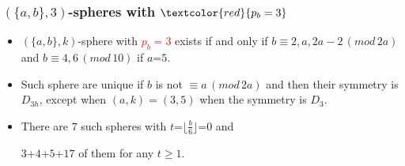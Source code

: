 \documentclass{beamer}
\begin{document}


\begin{frame}\frametitle{$(\{a,b\},3)$-spheres with
$\textcolor{red}{p_b=3}$}
\begin{itemize}

\item   $(\{a,b\},k)$-sphere with \textcolor{red}{$p_b=3$} exists
if and only if
$b\equiv 2,a,2a-2\,(mod\,2a)$ and  $b\equiv 4,6\,(mod\,10)$
if $a$=$5$.
\item  Such sphere are unique if $b$ is not
$\equiv a\,(mod\,2a)$ and then their symmetry is $D_{3h}$, except when
$(a,k)=(3,5)$ when the symmetry is $D_3$.
 

\item There are $7$ such spheres with $t$=$\lfloor{\frac{b}{6}}\rfloor$=$0$
and 

$3$+$4$+$5$+$17$ of them for any $t\ge 1$.
\end{itemize}
\end{frame}     
\end{document}
